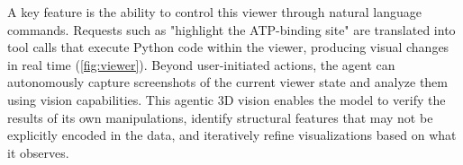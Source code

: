 \documentclass{article}
\begin{document}
A key feature is the ability to control this viewer through natural language commands. Requests such as "highlight the ATP-binding site" are translated into tool calls that execute Python code within the viewer, producing visual changes in real time (\cref{fig:viewer}). Beyond user-initiated actions, the agent can autonomously capture screenshots of the current viewer state and analyze them using vision capabilities. This agentic 3D vision enables the model to verify the results of its own manipulations, identify structural features that may not be explicitly encoded in the data, and iteratively refine visualizations based on what it observes. 


\end{document}

